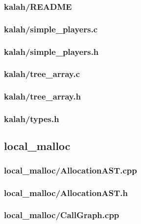 \documentclass{article}
\begin{document}
\subsubsection*{kalah/README}


\subsubsection*{kalah/simple\_players.c}


\subsubsection*{kalah/simple\_players.h}


\subsubsection*{kalah/tree\_array.c}


\subsubsection*{kalah/tree\_array.h}


\subsubsection*{kalah/types.h}


\subsection{local\_malloc}
\subsubsection*{local\_malloc/AllocationAST.cpp}


\subsubsection*{local\_malloc/AllocationAST.h}


\subsubsection*{local\_malloc/CallGraph.cpp}

\end{document}
